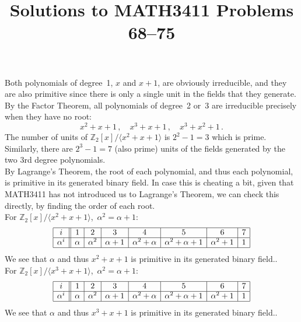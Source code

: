 \documentclass[11pt]{article}
\date{}
\author{}
\title{\sc Solutions to MATH3411 Problems 68--75}
\begin{document}
 \maketitle

\vspace*{-10mm}

  Both polynomials of degree~1, $x$ and $x+1$, are obviously irreducible,
  and they are also primitive since there is only a single unit in the fields that they generate.\\
  By the Factor Theorem, all polynomials of degree~2 or~3 are irreducible precisely when they have no root:
  \[
    x^2 + x + 1\,,\quad
    x^3 + x + 1\,,\quad
    x^3 + x^2 + 1\,.
  \]
  The number of units of $\mathbb{Z}_2[x]/\langle x^2 + x + 1\rangle$ is $2^2-1 = 3$ which is prime.\\
  Similarly, there are $2^3-1 = 7$ (also prime) units of the fields generated by the two 3rd degree polynomials.\\
  By Lagrange's Theorem, the root of each polynomial, and thus each polynomial, is primitive in its generated binary field.
  In case this is cheating a bit, given that MATH3411 has not introduced us to Lagrange's Theorem,
  we can check this directly, by finding the order of each root.\\
  For $\mathbb{Z}_2[x]/\langle x^2 + x + 1\rangle$,\,
      $\alpha^2 = \alpha + 1$:
  \[\begin{array}{|c||c|c|c|c|c|c|c|c|}\hline
           i &  1      &    2     &    3     &    4            &             5     &    6       &  7\\\hline
    \alpha^i &  \alpha & \alpha^2 & \alpha+1 & \alpha^2+\alpha & \alpha^2+\alpha+1 & \alpha^2+1 &  1\\\hline
  \end{array}\]
  We see that $\alpha$ and thus $x^2+x+1$ is primitive in its generated binary field..\\
  For $\mathbb{Z}_2[x]/\langle x^3 + x + 1\rangle$,\,
      $\alpha^2 = \alpha + 1$:
  \[\begin{array}{|c||c|c|c|c|c|c|c|c|}\hline
           i &  1      &    2     &    3     &    4            &             5     &    6       &  7\\\hline
    \alpha^i &  \alpha & \alpha^2 & \alpha+1 & \alpha^2+\alpha & \alpha^2+\alpha+1 & \alpha^2+1 &  1\\\hline
  \end{array}\]
  We see that $\alpha$ and thus $x^3+x+1$ is primitive in its generated binary field..\\
\end{document}
